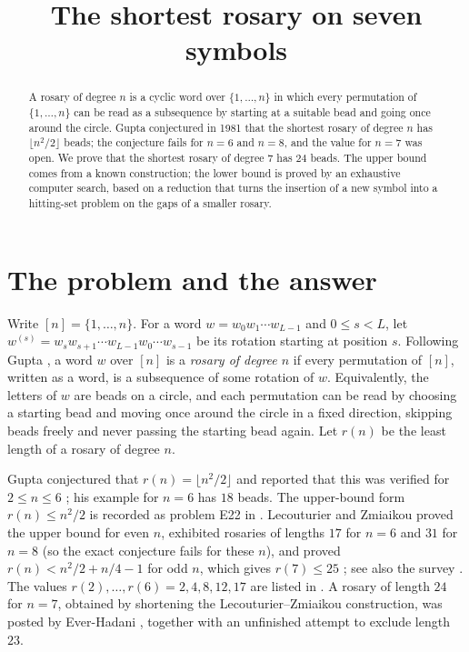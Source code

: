 \documentclass[a4paper,11pt]{amsart}
\title{The shortest rosary on seven symbols}
\date{}
\theoremstyle{remark}
\begin{document}
\begin{abstract}
A rosary of degree $n$ is a cyclic word over $\{1,\dots,n\}$ in which every
permutation of $\{1,\dots,n\}$ can be read as a subsequence by starting at a
suitable bead and going once around the circle.  Gupta conjectured in 1981
that the shortest rosary of degree $n$ has $\lfloor n^2/2\rfloor$ beads; the
conjecture fails for $n=6$ and $n=8$, and the value for $n=7$ was open.  We
prove that the shortest rosary of degree $7$ has $24$ beads.  The upper bound
comes from a known construction; the lower bound is proved by an exhaustive
computer search, based on a reduction that turns the insertion of a new
symbol into a hitting-set problem on the gaps of a smaller rosary.
\end{abstract}

\maketitle

\section{The problem and the answer}

Write $[n]=\{1,\dots,n\}$.  For a word $w=w_0w_1\cdots w_{L-1}$ and
$0\le s<L$, let $w^{(s)}=w_s w_{s+1}\cdots w_{L-1}w_0\cdots w_{s-1}$ be its
rotation starting at position $s$.  Following Gupta \cite{Gupta1981}, a word
$w$ over $[n]$ is a \emph{rosary of degree $n$} if every permutation of $[n]$,
written as a word, is a subsequence of some rotation of $w$.  Equivalently,
the letters of $w$ are beads on a circle, and each permutation can be read by
choosing a starting bead and moving once around the circle in a fixed
direction, skipping beads freely and never passing the starting bead again.
Let $r(n)$ be the least length of a rosary of degree $n$.

Gupta conjectured that $r(n)=\lfloor n^2/2\rfloor$ and reported that this
was verified for $2\le n\le 6$ \cite[p.~273]{Gupta1981}; his example for
$n=6$ has $18$ beads.  The upper-bound form $r(n)\le n^2/2$ is recorded as
problem E22 in \cite{Guy2004}.  Lecouturier and Zmiaikou proved the upper
bound for even $n$, exhibited rosaries of lengths $17$ for $n=6$ and $31$ for
$n=8$ (so the exact conjecture fails for these $n$), and proved
$r(n)<n^2/2+n/4-1$ for odd $n$, which gives $r(7)\le 25$
\cite{LZ2012}; see also the survey \cite{EV2021}.  The values
$r(2),\dots,r(6)=2,4,8,12,17$ are listed in \cite{A373728}.  A rosary of
length $24$ for $n=7$, obtained by shortening the Lecouturier--Zmiaikou
construction, was posted by Ever-Hadani \cite{EverHadani2026}, together with
an unfinished attempt to exclude length $23$.
\end{document}
